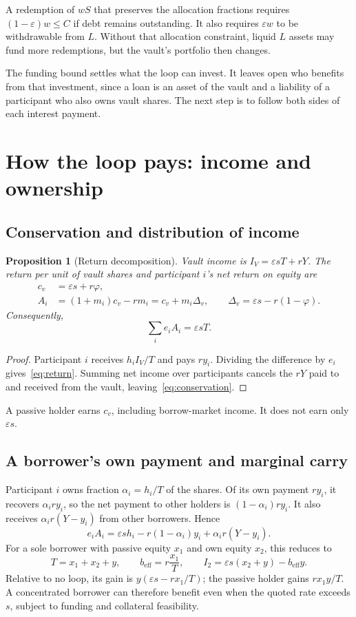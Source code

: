 \documentclass[12pt,oneside]{article}
\newtheorem{proposition}{Proposition}
\begin{document}
A redemption of $wS$ that preserves the allocation fractions requires
$(1-\varepsilon)w\leq C$ if debt remains outstanding. It also requires
$\varepsilon w$ to be withdrawable from $L$. Without that allocation
constraint, liquid $L$ assets may fund more redemptions, but the vault's
portfolio then changes.

The funding bound settles what the loop can invest. It leaves open
who benefits from that investment, since a loan is an asset of the
vault and a liability of a participant who also owns vault shares.
The next step is to follow both sides of each interest payment.

\section{How the loop pays: income and ownership}
\label{sec:returns}
\subsection{Conservation and distribution of income}
\begin{proposition}[Return decomposition]
\label{prop:returns}
Vault income is $I_V=\varepsilon sT+rY$. The return per unit of vault
shares and participant $i$'s net return on equity are
\begin{align}
 c_v&=\varepsilon s+r\varphi,\\
 A_i&=(1+m_i)c_v-rm_i
     =c_v+m_i\Delta_v,\qquad
 \Delta_v=\varepsilon s-r(1-\varphi).
 \label{eq:return}
\end{align}
Consequently,
\begin{equation}
 \sum_i e_i A_i=\varepsilon sT.
 \label{eq:conservation}
\end{equation}
\end{proposition}
\begin{proof}
Participant $i$ receives $h_iI_V/T$ and pays $ry_i$. Dividing the
difference by $e_i$ gives~\eqref{eq:return}. Summing net income over
participants cancels the $rY$ paid to and received from the vault,
leaving~\eqref{eq:conservation}.
\end{proof}
A passive holder earns $c_v$, including borrow-market income. It does
not earn only $\varepsilon s$.

\subsection{A borrower's own payment and marginal carry}
Participant $i$ owns fraction $\alpha_i=h_i/T$ of the shares. Of its
own payment $ry_i$, it recovers $\alpha_i ry_i$, so the net payment
to other holders is $(1-\alpha_i)ry_i$. It also receives
$\alpha_i r(Y-y_i)$ from other borrowers. Hence
\[
 e_iA_i=\varepsilon s h_i
       -r(1-\alpha_i)y_i+\alpha_i r(Y-y_i).
\]
For a sole borrower with passive equity $x_1$ and own equity $x_2$,
this reduces to
\[
 T=x_1+x_2+y,\qquad b_{\mathrm{eff}}=r\frac{x_1}{T},\qquad
 I_2=\varepsilon s(x_2+y)-b_{\mathrm{eff}}y.
\]
Relative to no loop, its gain is
$y(\varepsilon s-rx_1/T)$; the passive holder gains $rx_1y/T$.
A concentrated borrower can therefore benefit even when the quoted
rate exceeds $s$, subject to funding and collateral feasibility.
\end{document}
